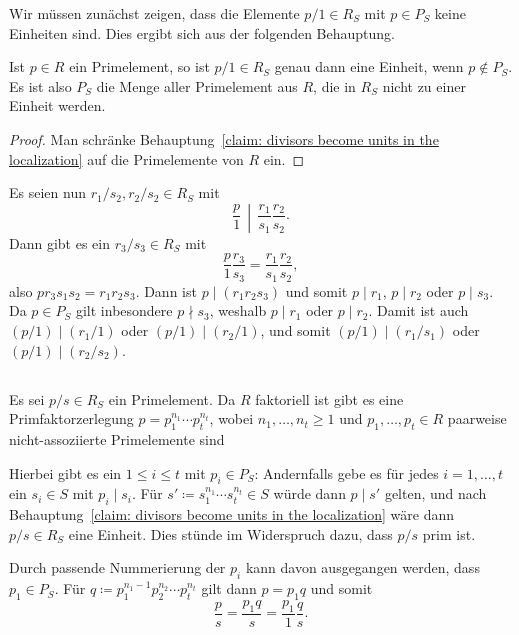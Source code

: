 \documentclass[a4paper,10pt,numbers=noenddot]{scrartcl}
\begin{document}
Wir müssen zunächst zeigen, dass die Elemente $p/1 \in R_S$ mit $p \in P_S$ keine Einheiten sind.
Dies ergibt sich aus der folgenden Behauptung.

\begin{claim}
  \label{claim: prime elements which become units in the localization}
  Ist $p \in R$ ein Primelement, so ist $p/1 \in R_S$ genau dann eine Einheit, wenn $p \notin P_S$.
  Es ist also $P_S$ die Menge aller Primelement aus $R$, die in $R_S$ nicht zu einer Einheit werden.
\end{claim}

\begin{proof}
  Man schränke Behauptung~\ref{claim: divisors become units in the localization} auf die Primelemente von $R$ ein.
\end{proof}

Es seien nun $r_1/s_2, r_2/s_2 \in R_S$ mit
\[
  \left. \frac{p}{1} \,\middle|\, \frac{r_1}{s_1} \frac{r_2}{s_2} \right..
\]
Dann gibt es ein $r_3/s_3 \in R_S$ mit
\[
    \frac{p}{1} \frac{r_3}{s_3}
  = \frac{r_1}{s_1} \frac{r_2}{s_2},
\]
also $p r_3 s_1 s_2 = r_1 r_2 s_3$.
Dann ist $p \mid (r_1 r_2 s_3)$ und somit $p \mid r_1$, $p \mid r_2$ oder $p \mid s_3$.
Da $p \in P_S$ gilt inbesondere $p \nmid s_3$, weshalb $p \mid r_1$ oder $p \mid r_2$.
Damit ist auch $(p/1) \mid (r_1/1)$ oder $(p/1) \mid (r_2/1)$, und somit $(p/1) \mid (r_1/s_1)$ oder $(p/1) \mid (r_2/s_2)$.





\subsection{}
\label{subsec: every prime element in the localization is associated to one in the ground ring}

Es sei $p/s \in R_S$ ein Primelement.
Da $R$ faktoriell ist gibt es eine Primfaktorzerlegung $p  = p_1^{n_1} \dotsm p_t^{n_t}$, wobei $n_1, \dotsc, n_t \geq 1$ und $p_1, \dotsc, p_t \in R$ paarweise nicht-assoziierte Primelemente sind

Hierbei gibt es ein $1 \leq i \leq t$ mit $p_i \in P_S$:
Andernfalls gebe es für jedes $i = 1, \dotsc, t$ ein $s_i \in S$ mit $p_i \mid s_i$.
Für $s' \coloneqq s_1^{n_1} \dotsm s_t^{n_t} \in S$ würde dann $p \mid s'$ gelten, und nach Behauptung~\ref{claim: divisors become units in the localization} wäre dann $p/s \in R_S$ eine Einheit.
Dies stünde im Widerspruch dazu, dass $p/s$ prim ist.

Durch passende Nummerierung der $p_i$ kann davon ausgegangen werden, dass $p_1 \in P_S$.
Für $q \coloneqq p_1^{n_1-1} p_2^{n_2} \dotsm p_t^{n_t}$ gilt dann $p = p_1 q$ und somit
\begin{equation}
  \label{eqn: association}
    \frac{p}{s}
  = \frac{p_1 q}{s}
  = \frac{p_1}{1} \frac{q}{s}.
\end{equation}
\end{document}
